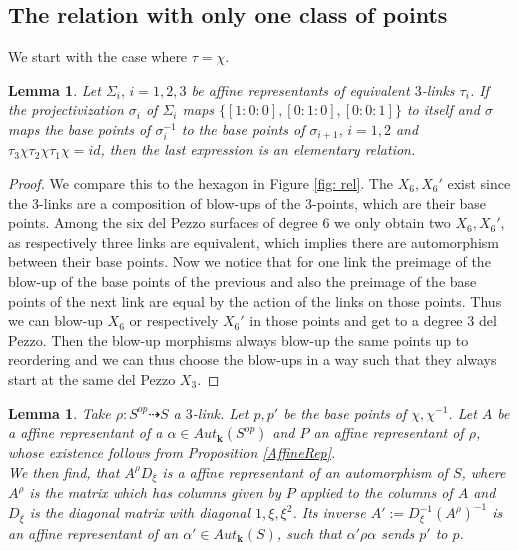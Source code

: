 \documentclass[12pt, oneside, reqno]{amsart}
\newtheorem{lemma}[theorem]{Lemma}
\begin{document}
\subsection{The relation with only one class of points}
We start with the case where $\tau = \chi$.
\begin{lemma}\label{ElemRel}
    Let $\Sigma_i, \, i=1,2,3$ be affine representants of equivalent $3$-links $\tau_i$. If the projectivization $\sigma_i$ of $\Sigma_i$ maps $\{[1:0:0],[0:1:0],[0:0:1] \}$ to itself and $\sigma$ maps the base points of $\sigma_{i}^{-1}$ to the base points of $\sigma_{i+1}, \, i=1,2$ and $\tau_3 \chi \tau_2 \chi \tau_1 \chi = id$, then the last expression is an elementary relation. 
\end{lemma}
\begin{proof}
    We compare this to the hexagon in Figure \ref{fig: rel}. 
    The $X_6, X_6'$ exist since the $3$-links are a composition of blow-ups of the $3$-points, which are their base points. Among the six del Pezzo surfaces of degree $6$ we only obtain two $X_6, X_6'$, as respectively three links are equivalent, which implies there are automorphism between their base points. Now we notice that for one link the preimage of the blow-up of the base points of the previous and also the preimage of the base points of the next link are equal by the action of the links on those points. Thus we can blow-up $X_6$ or respectively $X_6'$ in those points and get to a degree $3$ del Pezzo. Then the blow-up morphisms always blow-up the same points up to reordering and we can thus choose the blow-ups in a way such that they always start at the same del Pezzo $X_3$.
\end{proof}
\begin{lemma} \label{FixMatr}
  Take $\rho:S^{op} \dashrightarrow S$ a $3$-link. Let $p,p'$ be the base points of $\chi, \chi^{-1}$. Let $A$ be a affine representant of a $\alpha \in Aut_{\textbf{k}}(S^{op})$ and $P$ an affine representant of $\rho$, whose existence follows from Proposition \ref{AffineRep}. \\ We then find, that $A^{\rho}D_{\xi}$ is a affine representant of an automorphism of $S$, where $A^{\rho}$ is the matrix which has columns given by $P$ applied to the columns of $A$ and $D_{\xi}$ is the diagonal matrix with diagonal $1, \xi, \xi^2$. Its inverse $A' := D_{\xi}^{-1} (A^{\rho})^{-1}$ is an affine representant of an $\alpha' \in Aut_{\textbf{k}}(S)$, such that $\alpha' \rho \alpha$ sends $p'$ to $p$.  
\end{lemma}
\end{document}

